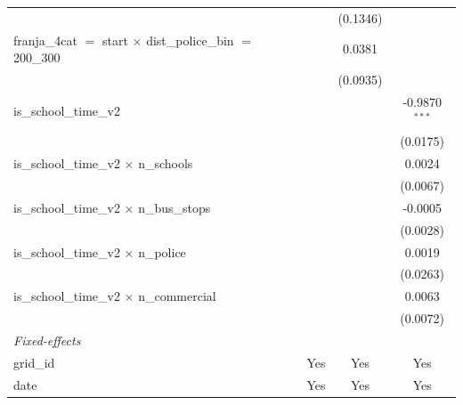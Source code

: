 \begin{tabular}{lccc}
                                                                                   &                 & (0.1346)             &   \\   
   franja\_4cat $=$ start $\times$ dist\_police\_bin $=$ 200\_300                  &                 & 0.0381               &   \\   
                                                                                   &                 & (0.0935)             &   \\   
   is\_school\_time\_v2                                                            &                 &                      & -0.9870$^{***}$\\   
                                                                                   &                 &                      & (0.0175)\\   
   is\_school\_time\_v2 $\times$ n\_schools                                        &                 &                      & 0.0024\\   
                                                                                   &                 &                      & (0.0067)\\   
   is\_school\_time\_v2 $\times$ n\_bus\_stops                                     &                 &                      & -0.0005\\   
                                                                                   &                 &                      & (0.0028)\\   
   is\_school\_time\_v2 $\times$ n\_police                                         &                 &                      & 0.0019\\   
                                                                                   &                 &                      & (0.0263)\\   
   is\_school\_time\_v2 $\times$ n\_commercial                                     &                 &                      & 0.0063\\   
                                                                                   &                 &                      & (0.0072)\\   
   \midrule
   \emph{Fixed-effects}\\
   grid\_id                                                                        & Yes             & Yes                  & Yes\\  
   date                                                                            & Yes             & Yes                  & Yes\\  

\end{tabular}
